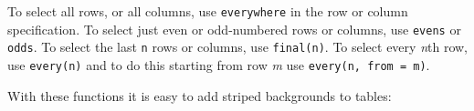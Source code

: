 \documentclass[]{article}
\newenvironment{Shaded}{\begin{snugshade}}{\end{snugshade}}
\newcommand{\KeywordTok}[1]{\textcolor[rgb]{0.13,0.29,0.53}{\textbf{#1}}}
\newcommand{\DecValTok}[1]{\textcolor[rgb]{0.00,0.00,0.81}{#1}}
\newcommand{\StringTok}[1]{\textcolor[rgb]{0.31,0.60,0.02}{#1}}
\newcommand{\OtherTok}[1]{\textcolor[rgb]{0.56,0.35,0.01}{#1}}
\newcommand{\OperatorTok}[1]{\textcolor[rgb]{0.81,0.36,0.00}{\textbf{#1}}}
\newcommand{\NormalTok}[1]{#1}
\begin{document}
To select all rows, or all columns, use \texttt{everywhere} in the row
or column specification. To select just even or odd-numbered rows or
columns, use \texttt{evens} or \texttt{odds}. To select the last
\texttt{n} rows or columns, use \texttt{final(n)}. To select every
\emph{n}th row, use \texttt{every(n)} and to do this starting from row
\emph{m} use \texttt{every(n,\ from\ =\ m)}.

With these functions it is easy to add striped backgrounds to tables:

\begin{Shaded}
\end{Shaded}
\end{document}
